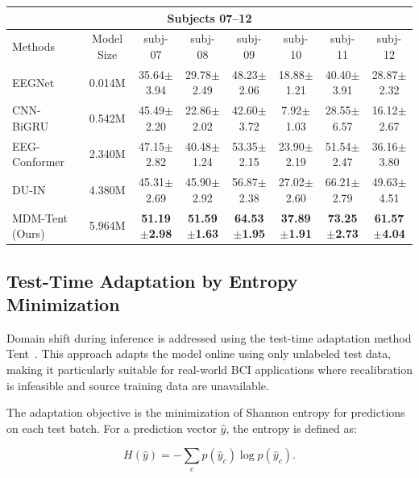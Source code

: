 \documentclass{article}
\begin{document}
\begin{table}[!ht]
    \begin{tabular}{l c c c c c c c}
    \toprule
    \multicolumn{8}{c}{\textbf{Subjects 07--12}} \\
    \midrule
    Methods & Model Size & subj-07 & subj-08 & subj-09 & subj-10 & subj-11 & subj-12 \\
    \midrule
    EEGNet~\cite{lawhern2018eegnet}        & 0.014M & 35.64$\pm$3.94 & 29.78$\pm$2.49 & 48.23$\pm$2.06 & 18.88$\pm$1.21 & 40.40$\pm$3.91 & 28.87$\pm$2.32 \\
    CNN-BiGRU~\cite{moses2021neuroprosthesis}     & 0.542M & 45.49$\pm$2.20 & 22.86$\pm$2.02 & 42.60$\pm$3.72 &  7.92$\pm$1.03 & 28.55$\pm$6.57 & 16.12$\pm$2.67 \\
    EEG-Conformer~\cite{song2022eeg} & 2.340M & 47.15$\pm$2.82 & 40.48$\pm$1.24 & 53.35$\pm$2.15 & 23.90$\pm$2.19 & 51.54$\pm$2.47 & 36.16$\pm$3.80 \\
    DU-IN~\cite{zheng2024discrete}          & 4.380M & 45.31$\pm$2.69 & 45.90$\pm$2.92 & 56.87$\pm$2.38 & 27.02$\pm$2.60 & 66.21$\pm$2.79 & 49.63$\pm$4.51 \\
    MDM-Tent (Ours)            & 5.964M & \textbf{51.19$\pm$2.98} & \textbf{51.59$\pm$1.63} & \textbf{64.53$\pm$1.95} & \textbf{37.89$\pm$1.91} & \textbf{73.25$\pm$2.73} & \textbf{61.57$\pm$4.04} \\
    \bottomrule
    \end{tabular}
\end{table}


\subsection{Test-Time Adaptation by Entropy Minimization}

Domain shift during inference is addressed using the test-time adaptation method Tent~\cite{wang2020tent}. This approach adapts the model online using only unlabeled test data, making it particularly suitable for real-world BCI applications where recalibration is infeasible and source training data are unavailable.

The adaptation objective is the minimization of Shannon entropy for predictions on each test batch. For a prediction vector $\hat{y}$, the entropy is defined as:

\begin{equation}
    H(\hat{y}) = - \sum_{c} p(\hat{y}_{c}) \log p(\hat{y}_{c}).
\end{equation}
\end{document}

